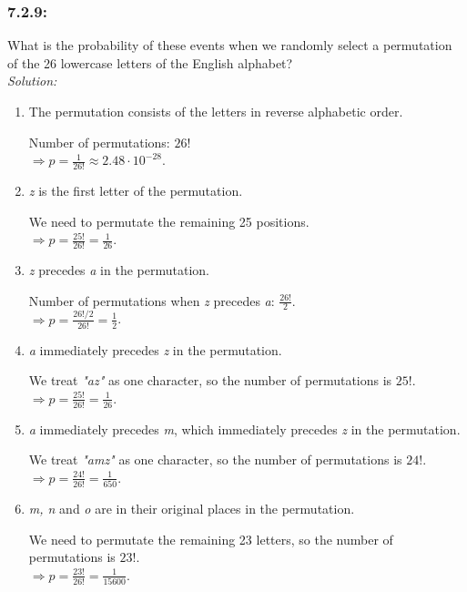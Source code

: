 \documentclass[a4paper]{article}
\begin{document}
\subsubsection*{7.2.9:}
What is the probability of these events when we randomly select a permutation of the 26 lowercase letters of the English alphabet?\\
\textit{Solution:}
\begin{enumerate}[label=\alph*)]
	\item The permutation consists of the letters in reverse alphabetic order.
	      
	      Number of permutations: $26!$ \\
	      $\Rightarrow p = \frac{1}{26!} \approx 2.48 \cdot 10^{-28}$.
	\item \textit{z} is the first letter of the permutation.
	      
	      We need to permutate the remaining 25 positions. \\
	      $\Rightarrow p = \frac{25!}{26!} = \frac{1}{26}$.
	\item \textit{z} precedes \textit{a} in the permutation.
	      
	      Number of permutations when \textit{z} precedes \textit{a}: $\frac{26!}{2}$. \\
	      $\Rightarrow p = \frac{26!/2}{26!} = \frac{1}{2}$.
	\item \textit{a} immediately precedes \textit{z} in the permutation.
	      
	      We treat \textit{"az"} as one character, so the number of permutations is $25!$. \\
	      $\Rightarrow p = \frac{25!}{26!} = \frac{1}{26}$.
	\item \textit{a} immediately precedes \textit{m}, which immediately precedes \textit{z} in the permutation.
	      
	      We treat \textit{"amz"} as one character, so the number of permutations is $24!$. \\
	      $\Rightarrow p = \frac{24!}{26!} = \frac{1}{650}$.
	\item \textit{m, n} and \textit{o} are in their original places in the permutation.
	      
	      We need to permutate the remaining 23 letters, so the number of permutations is $23!$. \\
	      $\Rightarrow p = \frac{23!}{26!} = \frac{1}{15600}$.
\end{enumerate}

\end{document}
